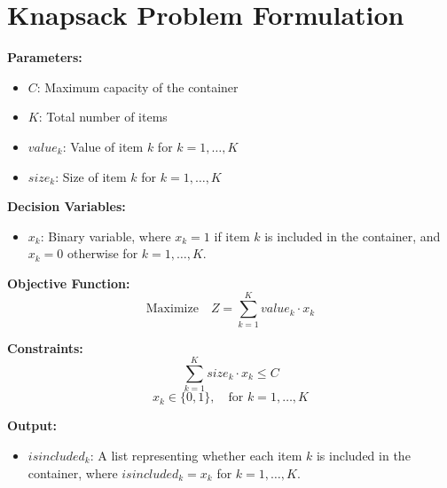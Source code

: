 \documentclass{article}
\begin{document}
\section*{Knapsack Problem Formulation}

\textbf{Parameters:}
\begin{itemize}
    \item $C$: Maximum capacity of the container
    \item $K$: Total number of items
    \item $value_k$: Value of item $k$ for $k = 1, \ldots, K$
    \item $size_k$: Size of item $k$ for $k = 1, \ldots, K$
\end{itemize}

\textbf{Decision Variables:}
\begin{itemize}
    \item $x_k$: Binary variable, where $x_k = 1$ if item $k$ is included in the container, and $x_k = 0$ otherwise for $k = 1, \ldots, K$.
\end{itemize}

\textbf{Objective Function:}
\[
\text{Maximize} \quad Z = \sum_{k=1}^{K} value_k \cdot x_k
\]

\textbf{Constraints:}
\[
\sum_{k=1}^{K} size_k \cdot x_k \leq C
\]
\[
x_k \in \{0, 1\}, \quad \text{for } k = 1, \ldots, K
\]

\textbf{Output:}
\begin{itemize}
    \item $isincluded_k$: A list representing whether each item $k$ is included in the container, where $isincluded_k = x_k$ for $k = 1, \ldots, K$.
\end{itemize}
\end{document}
